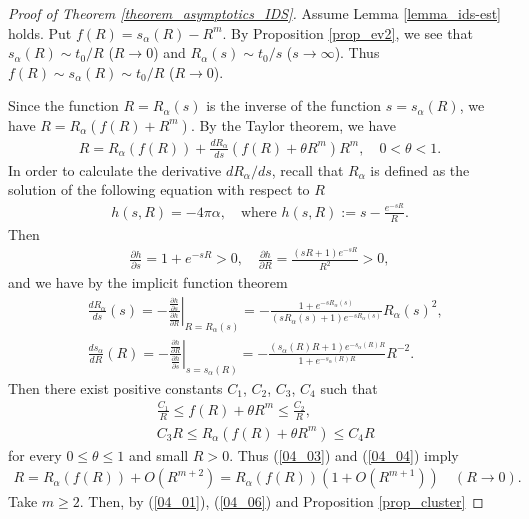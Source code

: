 \documentclass[10pt,a4paper]{amsart}
\begin{document}
\begin{proof}[Proof of Theorem \ref{theorem_asymptotics_IDS}]
Assume Lemma \ref{lemma_ids-est} holds.
Put $f(R)=s_\alpha(R)-R^m$.
By Proposition \ref{prop_ev2},
we see that $s_\alpha(R)\sim t_0/R$ ($R\to 0$) and
$R_\alpha(s)\sim t_0/s$ ($s\to \infty$).
Thus $f(R)\sim s_\alpha(R)\sim t_0/R$ ($R\to 0$).


Since 
the function $R=R_\alpha(s)$ is the inverse of 
the function $s=s_\alpha(R)$, we have
$R=R_\alpha(f(R)+R^m)$.
By the Taylor theorem, we have
\begin{align}
R=
R_\alpha(f(R))+\frac{d R_\alpha}{d s}(f(R)+\theta R^m)R^m,\quad 0<\theta<1.
\label{04_03}
\end{align}
In order to calculate the derivative $dR_\alpha/ds$,
recall that $R_\alpha$ is defined as the solution of the 
following equation with respect to $R$
\begin{align*}
 h(s,R)=-4\pi\alpha,\quad
\mbox{where }
h(s,R):=s- \frac{e^{-sR}}{R}.
\end{align*}
Then
\begin{align*}
 \frac{\partial h}{\partial s}=
1+e^{-sR}>0,\quad
 \frac{\partial h}{\partial R}=
\frac{(sR+1)e^{-sR}}{R^2}>0,
\end{align*}
and we have by the implicit function theorem
\begin{align}
&\frac{dR_\alpha}{ds}(s)
=-
\left.
\frac{\frac{\partial h}{\partial s}}{\frac{\partial h}{\partial R}}
\right|_{R=R_\alpha(s)}
=
-\frac{ 1+e^{-sR_\alpha(s)}}{(sR_\alpha(s)+1)e^{-sR_\alpha(s)}}R_\alpha(s)^2,
\label{04_04}\\
&\frac{ds_\alpha}{dR}(R)
=-
\left.
\frac{\frac{\partial h}{\partial R}}{\frac{\partial h}{\partial s}}
\right|_{s=s_\alpha(R)}
=
-
\frac{(s_\alpha(R)R+1)e^{-s_\alpha(R)R}}{ 1+e^{-s_\alpha(R)R}}R^{-2}.
\label{04_05}
\end{align}
Then there exist positive constants 
$C_1$, $C_2$, $C_3$, $C_4$ such that
\begin{align*}
&\frac{C_1}{R}\leq f(R)+\theta R^m \leq \frac{C_2}{R},\\
&C_3 R\leq R_\alpha(f(R) + \theta R^m)\leq C_4 R
\end{align*}
for every $0\leq \theta \leq 1$ and small $R>0$.
Thus (\ref{04_03}) and (\ref{04_04}) imply
\begin{align}
\label{04_06}
 R = R_\alpha(f(R)) + O(R^{m+2})
=R_\alpha(f(R))(1+O(R^{m+1}))
\quad (R\to 0).
\end{align}
Take $m\geq 2$.
Then, by (\ref{04_01}), (\ref{04_06}) and Proposition \ref{prop_cluster}

\end{proof}
\end{document}
